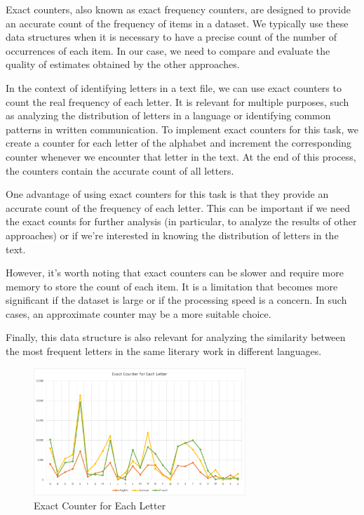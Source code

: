 \documentclass[]{revdetua}
\begin{document}
Exact counters, also known as exact frequency counters, are designed to provide an accurate count of the frequency of items in a dataset. We typically use these data structures when it is necessary to have a precise count of the number of occurrences of each item. In our case, we need to compare and evaluate the quality of estimates obtained by the other approaches.

In the context of identifying letters in a text file, we can use exact counters to count the real frequency of each letter. It is relevant for multiple purposes, such as analyzing the distribution of letters in a language or identifying common patterns in written communication. To implement exact counters for this task, we create a counter for each letter of the alphabet and increment the corresponding counter whenever we encounter that letter in the text. At the end of this process, the counters contain the accurate count of all letters.

One advantage of using exact counters for this task is that they provide an accurate count of the frequency of each letter. This can be important if we need the exact counts for further analysis (in particular, to analyze the results of other approaches) or if we're interested in knowing the distribution of letters in the text.

However, it's worth noting that exact counters can be slower and require more memory to store the count of each item. It is a limitation that becomes more significant if the dataset is large or if the processing speed is a concern. In such cases, an approximate counter may be a more suitable choice.

Finally, this data structure is also relevant for analyzing the similarity between the most frequent letters in the same literary work in different languages.

\begin{figure}[H]
    \centering
    \includegraphics[width=8cm]{Exact Counter for Each Letter.png}
    \caption{Exact Counter for Each Letter}
\end{figure}
\end{document}
